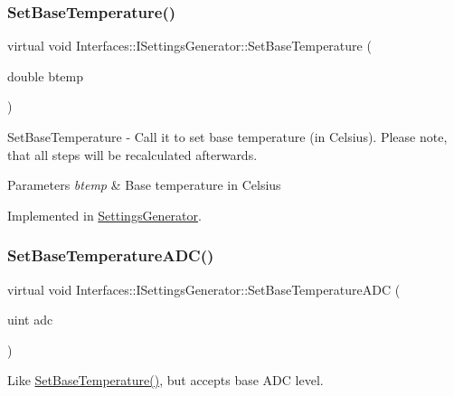 \subsubsection{\texorpdfstring{Set\+Base\+Temperature()}{SetBaseTemperature()}}
{\footnotesize\ttfamily virtual void Interfaces\+::\+I\+Settings\+Generator\+::\+Set\+Base\+Temperature (\begin{DoxyParamCaption}\item[{double}]{btemp }\end{DoxyParamCaption})\hspace{0.3cm}{\ttfamily [pure virtual]}}



Set\+Base\+Temperature -\/ Call it to set base temperature (in Celsius). Please note, that all steps will be recalculated afterwards. 


\begin{DoxyParams}{Parameters}
{\em btemp} & Base temperature in Celsius \\
\hline
\end{DoxyParams}


Implemented in \hyperlink{class_settings_generator_aed9e7acb30bfd559b1ac70ceeddd8973}{Settings\+Generator}.

\mbox{\label{class_interfaces_1_1_i_settings_generator_af681d36295e95bd52cbfd1bbc3ae8cf9}} 
\subsubsection{\texorpdfstring{Set\+Base\+Temperature\+A\+D\+C()}{SetBaseTemperatureADC()}}
{\footnotesize\ttfamily virtual void Interfaces\+::\+I\+Settings\+Generator\+::\+Set\+Base\+Temperature\+A\+DC (\begin{DoxyParamCaption}\item[{uint}]{adc }\end{DoxyParamCaption})\hspace{0.3cm}{\ttfamily [pure virtual]}}



Like \hyperlink{class_interfaces_1_1_i_settings_generator_a8b60ba05790994db0303b251f655e95d}{Set\+Base\+Temperature()}, but accepts base A\+DC level. 


